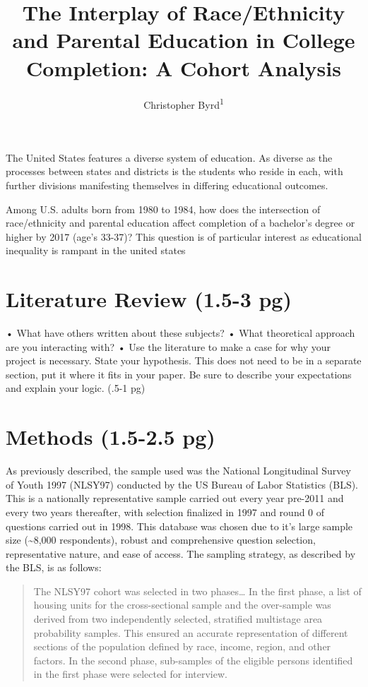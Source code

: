 \documentclass[
  man,floatsintext]{apa6}
\title{The Interplay of Race/Ethnicity and Parental Education in College Completion: A Cohort Analysis}
\author{Christopher Byrd\textsuperscript{1}}
\date{}
\affiliation{\vspace{0.5cm}\textsuperscript{1} Whitworth University}
\begin{document}
\maketitle

The United States features a diverse system of education. As diverse as the processes between states and districts is the students who reside in each, with further divisions manifesting themselves in differing educational outcomes.

Among U.S. adults born from 1980 to 1984, how does the intersection of race/ethnicity and parental education affect completion of a bachelor's degree or higher by 2017 (age's 33-37)? This question is of particular interest as educational inequality is rampant in the united states

\section{Literature Review (1.5-3 pg)}\label{literature-review-1.5-3-pg}

• What have others written about these subjects? • What theoretical approach are you interacting with? • Use the literature to make a case for why your project is necessary. State your hypothesis. This does not need to be in a separate section, put it where it fits in your paper. Be sure to describe your expectations and explain your logic. (.5-1 pg)

\section{Methods (1.5-2.5 pg)}\label{methods-1.5-2.5-pg}

As previously described, the sample used was the National Longitudinal Survey of Youth 1997 (NLSY97) conducted by the US Bureau of Labor Statistics (BLS). This is a nationally representative sample carried out every year pre-2011 and every two years thereafter, with selection finalized in 1997 and round 0 of questions carried out in 1998. This database was chosen due to it's large sample size (\textasciitilde8,000 respondents), robust and comprehensive question selection, representative nature, and ease of access. The sampling strategy, as described by the BLS, is as follows:

\begin{quote}
The NLSY97 cohort was selected in two phases\ldots{} In the first phase, a list of housing units for the cross-sectional sample and the over-sample was derived from two independently selected, stratified multistage area probability samples. This ensured an accurate representation of different sections of the population defined by race, income, region, and other factors. In the second phase, sub-samples of the eligible persons identified in the first phase were selected for interview.
\end{quote}
\end{document}
